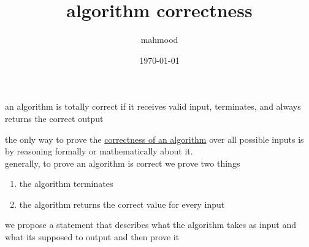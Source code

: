 \documentclass[a4paper,12pt]{article}
\author{mahmood}
\date{\today}
\title{algorithm correctness}
\begin{document}
\maketitle
\begin{definition}
an algorithm is totally correct if it receives valid input, terminates, and always returns the correct output\\[0pt]
\end{definition}
the only way to prove the \href{20221104220603-algorithm_correctness.org}{correctness of an algorithm} over all possible inputs is by reasoning formally or mathematically about it.\\[0pt]
generally, to prove an algorithm is correct we prove two things\\[0pt]
\begin{enumerate}
\item the algorithm terminates\\[0pt]
\item the algorithm returns the correct value for every input\\[0pt]
\end{enumerate}
we propose a statement that describes what the algorithm takes as input and what its supposed to output and then prove it\\[0pt]
\end{document}
